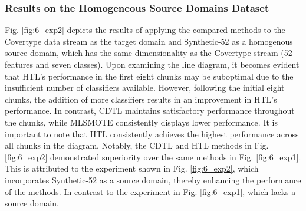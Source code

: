 \subsubsection{Results on the Homogeneous Source Domains Dataset}
Fig. \ref{fig:6_exp2} depicts the results of applying the compared methods to the Covertype data stream as the target domain and Synthetic-52 as a homogenous source domain, which has the same dimensionality as the Covertype stream (52 features and seven classes). Upon examining the line diagram, it becomes evident that HTL's performance in the first eight chunks may be suboptimal due to the insufficient number of classifiers available. However, following the initial eight chunks, the addition of more classifiers results in an improvement in HTL's performance. In contrast, CDTL maintains satisfactory performance throughout the chunks, while MLSMOTE consistently displays lower performance. It is important to note that HTL consistently achieves the highest performance across all chunks in the diagram. Notably, the CDTL and HTL methods in Fig. \ref{fig:6_exp2} demonstrated superiority over the same methods in Fig. \ref{fig:6_exp1}. This is attributed to the experiment shown in Fig. \ref{fig:6_exp2}, which incorporates Synthetic-52 as a source domain, thereby enhancing the performance of the methods. In contrast to the experiment in Fig. \ref{fig:6_exp1}, which lacks a source domain.

